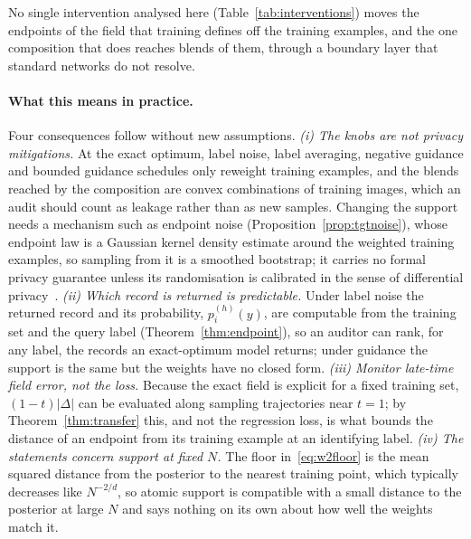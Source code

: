No single intervention analysed here (Table~\ref{tab:interventions}) moves the endpoints of the
field that training defines off the training examples, and the one composition that does reaches
blends of them, through a boundary layer that standard networks do not resolve.

\paragraph{What this means in practice.} Four consequences follow without new assumptions.
\emph{(i) The knobs are not privacy mitigations.} At the exact optimum, label noise, label
averaging, negative guidance and bounded guidance schedules only reweight training examples, and
the blends reached by the composition are convex combinations of training images, which an audit
should count as leakage rather than as new samples. Changing the support needs a mechanism such as
endpoint noise (Proposition~\ref{prop:tgtnoise}), whose endpoint law is a Gaussian kernel density
estimate around the weighted training examples, so sampling from it is a smoothed bootstrap; it carries no formal privacy guarantee unless its
randomisation is calibrated in the sense of differential privacy~\citep{TODO-dwork2014}.
\emph{(ii) Which record is returned is predictable.} Under label noise the returned record and
its probability, $p_i^{(h)}(y)$, are computable from the training set and the query label
(Theorem~\ref{thm:endpoint}), so an auditor can rank, for any label, the records an exact-optimum
model returns; under guidance the support is the same but the weights have no closed form.
\emph{(iii) Monitor late-time field error, not the loss.} Because the exact field is explicit for
a fixed training set, $(1-t)|\Delta|$ can be evaluated along sampling trajectories near $t=1$;
by Theorem~\ref{thm:transfer} this, and not the regression loss, is what bounds the distance of an
endpoint from its training example at an identifying label.
\emph{(iv) The statements concern support at fixed $N$.} The floor in~\eqref{eq:w2floor} is the
mean squared distance from the posterior to the nearest training point, which typically decreases
like $N^{-2/d}$, so atomic support is compatible with a small distance to the posterior at large
$N$ and says nothing on its own about how well the weights match it.


